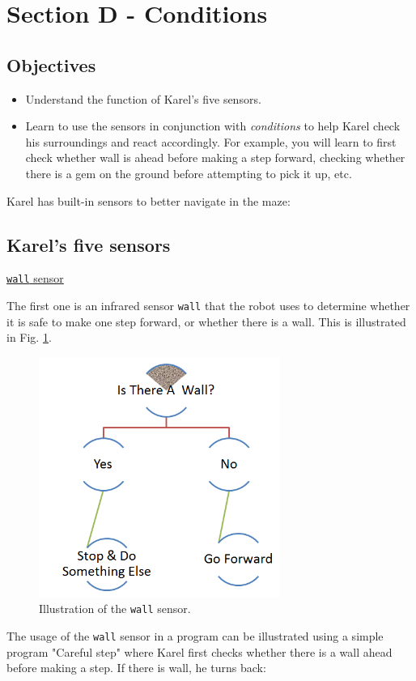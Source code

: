 \documentclass[article,A4,12pt]{llncs}
\begin{document}
{{{{\section{Section D - Conditions}

\subsection{Objectives} 

\begin{itemize}
\item Understand the function of Karel's five sensors.
\item Learn to use the sensors in conjunction with {\em conditions} to help Karel 
      check his surroundings and react accordingly. For example, you will learn to first 
      check whether wall is ahead before making a step forward, checking whether there
      is a gem on the ground before attempting to pick it up, etc.
\end{itemize}

\noindent
Karel has built-in sensors to better navigate in the maze:

\subsection{Karel's five sensors}

\noindent
\underline{{\tt wall} sensor}

The first one is an infrared sensor {\tt wall} that the robot uses to determine 
whether it is safe to make one step forward, or whether there is a wall. This is 
illustrated in Fig. \ref{fig:dede-ifelse}.

\begin{figure}[!ht]
\begin{center}
\includegraphics[width=0.7\textwidth]{img/salih-ifelse.png}
\end{center}
\vspace{-4mm}
\caption{Illustration of the {\tt wall} sensor.}
\label{fig:dede-ifelse}
\end{figure}
\noindent
The usage of the {\tt wall} sensor in a program can be illustrated using a simple program "Careful step" 
where Karel first checks whether there is a wall ahead before
making a step. If there is wall, he turns back: 

}}}}
\end{document}
